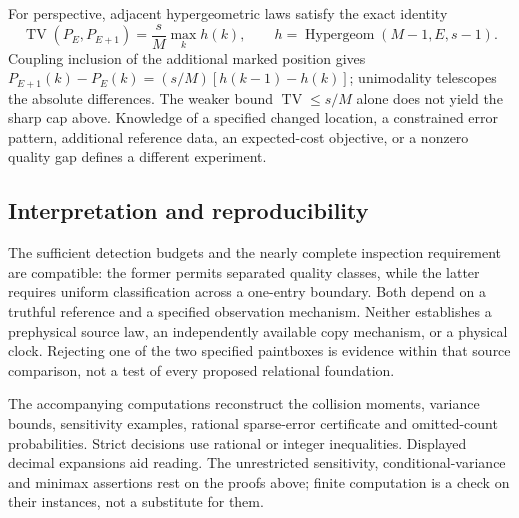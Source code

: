 For perspective, adjacent hypergeometric laws satisfy the exact identity
\[
 \operatorname{TV}(P_E,P_{E+1})=\frac{s}{M}\max_k h(k),\qquad
 h=\operatorname{Hypergeom}(M-1,E,s-1).
\]
Coupling inclusion of the additional marked position gives
$P_{E+1}(k)-P_E(k)=(s/M)[h(k-1)-h(k)]$; unimodality telescopes the absolute differences. The weaker bound $\operatorname{TV}\le s/M$ alone does not yield the sharp cap above. Knowledge of a specified changed location, a constrained error pattern, additional reference data, an expected-cost objective, or a nonzero quality gap defines a different experiment.

\subsection{Interpretation and reproducibility}
\label{sam:interpretation}
The sufficient detection budgets and the nearly complete inspection requirement are compatible: the former permits separated quality classes, while the latter requires uniform classification across a one-entry boundary. Both depend on a truthful reference and a specified observation mechanism. Neither establishes a prephysical source law, an independently available copy mechanism, or a physical clock. Rejecting one of the two specified paintboxes is evidence within that source comparison, not a test of every proposed relational foundation.

The accompanying computations reconstruct the collision moments, variance bounds, sensitivity examples, rational sparse-error certificate and omitted-count probabilities. Strict decisions use rational or integer inequalities. Displayed decimal expansions aid reading. The unrestricted sensitivity, conditional-variance and minimax assertions rest on the proofs above; finite computation is a check on their instances, not a substitute for them.
